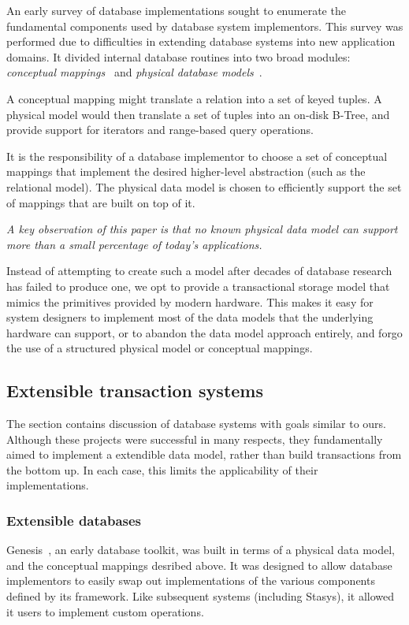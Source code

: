 \documentclass[letterpaper,twocolumn,10pt]{article}
\newcommand{\yad}{Stasys\xspace}
\begin{document}
An early survey of database implementations sought to enumerate the
fundamental components used by database system implementors.  This
survey was performed due to difficulties in extending database systems
into new application domains.  It divided internal database
routines into two broad modules: {\em conceptual
mappings}~\cite{batoryConceptual} and {\em physical
database models}~\cite{batoryPhysical}.

A conceptual mapping might translate a relation into a set of keyed
tuples.  A physical model would then translate a set of tuples into an
on-disk B-Tree, and provide support for iterators and range-based query
operations.

It is the responsibility of a database implementor to choose a set of
conceptual mappings that implement the desired higher-level
abstraction (such as the relational model).  The physical data model
is chosen to efficiently support the set of mappings that are built on
top of it.

{\em A key observation of this paper is that no known physical data model
can support more than a small percentage of today's applications.}

Instead of attempting to create such a model after decades of database
research has failed to produce one, we opt to provide a transactional
storage model that mimics the primitives provided by modern hardware.
This makes it easy for system designers to implement most of the data
models that the underlying hardware can support, or to
abandon the data model approach entirely, and forgo the use of a
structured physical model or conceptual mappings.

\subsection{Extensible transaction systems} 

The section contains discussion of database systems with goals similar to ours.
Although these projects were
successful in many respects, they fundamentally aimed to implement a
extendible data model, rather than build transactions from the bottom up.
In each case, this limits the applicability of their implementations.

\subsubsection{Extensible databases}

Genesis~\cite{genesis}, an early database toolkit, was built in terms
of a physical data model, and the conceptual mappings desribed above.
It was designed to allow database implementors to easily swap out
implementations of the various components defined by its framework.
Like subsequent systems (including \yad), it allowed it users to
implement custom operations.
\end{document}
